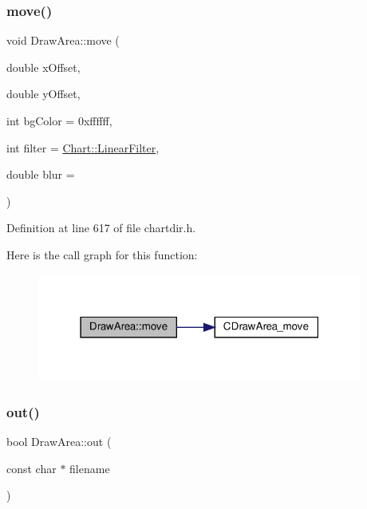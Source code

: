 \subsubsection{\texorpdfstring{move()}{move()}}
{\footnotesize\ttfamily void Draw\+Area\+::move (\begin{DoxyParamCaption}\item[{double}]{x\+Offset,  }\item[{double}]{y\+Offset,  }\item[{int}]{bg\+Color = {\ttfamily 0xffffff},  }\item[{int}]{filter = {\ttfamily \hyperlink{namespace_chart_ab75b9aa1781d0e0159ef1d441b577764a8cd729b7a982bac2dce8b021511e3ac6}{Chart\+::\+Linear\+Filter}},  }\item[{double}]{blur = {} }\end{DoxyParamCaption})\hspace{0.3cm}{\ttfamily [inline]}}



Definition at line 617 of file chartdir.\+h.

Here is the call graph for this function\+:
\nopagebreak
\begin{figure}[H]
\begin{center}
\leavevmode
\includegraphics[width=303pt]{class_draw_area_ac6004a74de78eb60bf5ce415070cce6f_cgraph}
\end{center}
\end{figure}
\mbox{\label{class_draw_area_ae9ead4ed0341bb6dc724bed992f9f973}} 
\subsubsection{\texorpdfstring{out()}{out()}}
{\footnotesize\ttfamily bool Draw\+Area\+::out (\begin{DoxyParamCaption}\item[{const char $\ast$}]{filename }\end{DoxyParamCaption})\hspace{0.3cm}{\ttfamily [inline]}}



